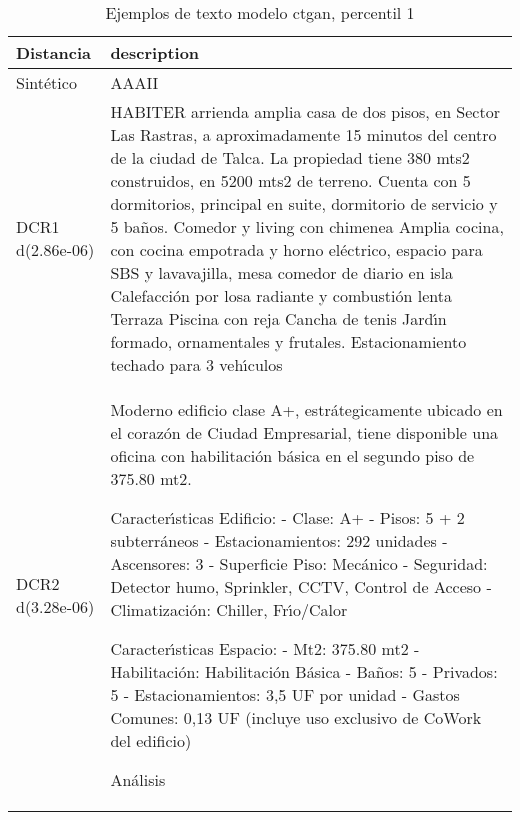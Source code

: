 \begin{table}[H]
\centering
\fontsize{10}{14}\selectfont
\caption{Ejemplos de texto modelo ctgan, percentil 1}
\label{table-example-economicos-a-2-ctgan-1p-text}
\begin{tabular}{|l|m{35em}|}
\hline
\rowcolor[gray]{0.8}
Distancia & description \\
\hline Sintético & AAAII \\
\hline DCR1 d(2.86e-06) & HABITER arrienda amplia casa de dos pisos, en Sector Las Rastras, a aproximadamente 15 minutos del centro de la ciudad de Talca.  La propiedad tiene 380 mts2 construidos, en 5200 mts2 de terreno. Cuenta con 5 dormitorios, principal en suite, dormitorio de servicio y 5 ba\~nos.   Comedor y living con chimenea Amplia cocina, con cocina empotrada y horno el\'ectrico, espacio para SBS y lavavajilla, mesa comedor de diario en isla Calefacci\'on por losa radiante y combusti\'on lenta Terraza Piscina con reja Cancha de tenis Jard{\'\i}n formado, ornamentales y frutales.  Estacionamiento techado para 3 veh{\'\i}culos \\
\hline DCR2 d(3.28e-06) & Moderno edificio clase A+, estr\'ategicamente ubicado en el coraz\'on de Ciudad Empresarial, tiene disponible una oficina con habilitaci\'on b\'asica en el segundo piso de 375.80 mt2.

Caracter{\'\i}sticas Edificio:
-	Clase: A+
-	Pisos: 5 + 2 subterr\'aneos
-	Estacionamientos: 292 unidades
-	Ascensores: 3
-	Superficie Piso: Mec\'anico
-	Seguridad: Detector humo, Sprinkler, CCTV, Control de Acceso
-	Climatizaci\'on: Chiller, Fr{\'\i}o/Calor

Caracter{\'\i}sticas Espacio:
-	Mt2: 375.80 mt2
-	Habilitaci\'on: Habilitaci\'on B\'asica
-	Ba\~nos: 5
-	Privados: 5
-	Estacionamientos: 3,5 UF por unidad
-	Gastos Comunes: 0,13 UF (incluye uso exclusivo de CoWork del edificio)

An\'alisis \\
\hline
\end{tabular}
\end{table}
